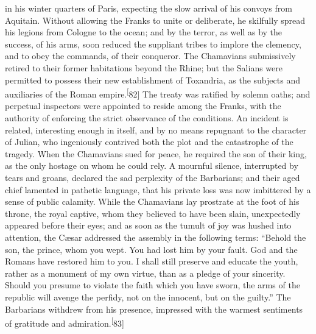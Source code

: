 in his winter quarters of Paris, expecting the slow arrival of
his convoys from Aquitain. Without allowing the Franks to unite
or deliberate, he skilfully spread his legions from Cologne to
the ocean; and by the terror, as well as by the success, of his
arms, soon reduced the suppliant tribes to implore the clemency,
and to obey the commands, of their conqueror. The Chamavians
submissively retired to their former habitations beyond the
Rhine; but the Salians were permitted to possess their new
establishment of Toxandria, as the subjects and auxiliaries of
the Roman empire.\textsuperscript[82] The treaty was ratified by solemn oaths; and
perpetual inspectors were appointed to reside among the Franks,
with the authority of enforcing the strict observance of the
conditions. An incident is related, interesting enough in itself,
and by no means repugnant to the character of Julian, who
ingeniously contrived both the plot and the catastrophe of the
tragedy. When the Chamavians sued for peace, he required the son
of their king, as the only hostage on whom he could rely. A
mournful silence, interrupted by tears and groans, declared the
sad perplexity of the Barbarians; and their aged chief lamented
in pathetic language, that his private loss was now imbittered by
a sense of public calamity. While the Chamavians lay prostrate at
the foot of his throne, the royal captive, whom they believed to
have been slain, unexpectedly appeared before their eyes; and as
soon as the tumult of joy was hushed into attention, the Cæsar
addressed the assembly in the following terms: “Behold the son,
the prince, whom you wept. You had lost him by your fault. God
and the Romans have restored him to you. I shall still preserve
and educate the youth, rather as a monument of my own virtue,
than as a pledge of your sincerity. Should you presume to violate
the faith which you have sworn, the arms of the republic will
avenge the perfidy, not on the innocent, but on the guilty.” The
Barbarians withdrew from his presence, impressed with the warmest
sentiments of gratitude and admiration.\textsuperscript[83]



